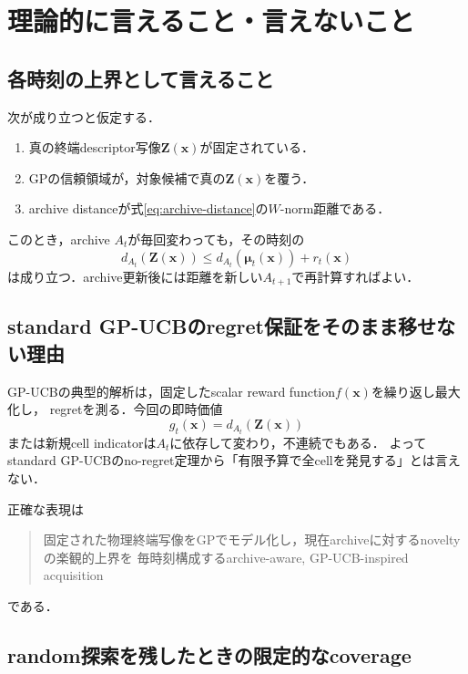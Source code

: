 \documentclass[a4paper,11pt]{ltjsarticle}
\begin{document}
\section{理論的に言えること・言えないこと}
\label{sec:theoretical-scope}

\subsection{各時刻の上界として言えること}

次が成り立つと仮定する．
\begin{enumerate}
  \item 真の終端descriptor写像\(\bm Z(\bm x)\)が固定されている．
  \item GPの信頼領域が，対象候補で真の\(\bm Z(\bm x)\)を覆う．
  \item archive distanceが式\eqref{eq:archive-distance}の\(W\)-norm距離である．
\end{enumerate}
このとき，archive \(A_t\)が毎回変わっても，その時刻の
\begin{equation}
  d_{A_t}(\bm Z(\bm x))
  \leq d_{A_t}(\bm\mu_t(\bm x))+r_t(\bm x)
\end{equation}
は成り立つ．archive更新後には距離を新しい\(A_{t+1}\)で再計算すればよい．

\subsection{standard GP-UCBのregret保証をそのまま移せない理由}

GP-UCBの典型的解析は，固定したscalar reward function\(f(\bm x)\)を繰り返し最大化し，
regretを測る\citep{srinivas2010gpucb}．今回の即時価値
\begin{equation}
  g_t(\bm x)=d_{A_t}(\bm Z(\bm x))
\end{equation}
または新規cell indicatorは\(A_t\)に依存して変わり，不連続でもある．
よってstandard GP-UCBのno-regret定理から「有限予算で全cellを発見する」とは言えない．

正確な表現は
\begin{quote}
固定された物理終端写像をGPでモデル化し，現在archiveに対するnoveltyの楽観的上界を
毎時刻構成するarchive-aware, GP-UCB-inspired acquisition
\end{quote}
である．

\subsection{random探索を残したときの限定的なcoverage}
\end{document}
